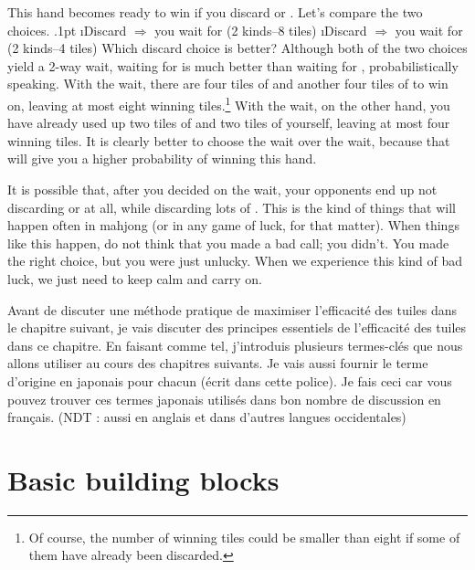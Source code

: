 \bigskip
\noindent
This hand becomes ready to win if you discard {\LARGE{}} or {\LARGE{}}. Let's compare the two choices.
\bi\itemsep.1pt
\i Discard {\LARGE{}} \hfill $\Rightarrow$ you wait for {\LARGE{} } (2 kinds--8 tiles)
\i Discard {\LARGE{}} \hfill $\Rightarrow$ you wait for {\LARGE{}} {\LARGE{}} (2 kinds--4 tiles)
\ei
Which discard choice is better? Although both of the two choices yield a 2-way wait, waiting for {\LARGE{} } is much better than waiting for {\LARGE{}} {\LARGE{}}, probabilistically speaking. With the {\LARGE{} } wait, there are four tiles of {\LARGE{}} and another four tiles of {\LARGE{}} to win on, leaving at most eight winning tiles.\footnote{Of course, the number of winning tiles could be smaller than eight if some of them have already been discarded.} 
With the {\LARGE{}} {\LARGE{}} wait, on the other hand, you have already used up two tiles of {\LARGE{}} and two tiles of {\LARGE{}} yourself, leaving at most four winning tiles. It is clearly better to choose the {\LARGE{} } wait over the {\LARGE{}} {\LARGE{}} wait, because that will give you a higher probability of winning this hand. 

\bigskip
It is possible that, after you decided on the {\LARGE{} } wait, your opponents end up not discarding {\LARGE{}} or {\LARGE{}} at all, while discarding lots of {\LARGE{} }. This is the kind of things that will happen often in mahjong (or in any game of luck, for that matter). When things like this happen, do not think that you made a bad call; you didn't. You made the right choice, but you were just unlucky. When we experience this kind of bad luck, we just need to keep calm and carry on. 

\bigskip
Avant de discuter une méthode pratique de maximiser l'efficacité des tuiles dans le chapitre suivant, je vais discuter des principes essentiels de l'efficacité des tuiles dans ce chapitre. En faisant comme tel, j'introduis plusieurs termes-clés que nous allons utiliser au cours des chapitres suivants. Je vais aussi fournir le terme d'origine en japonais pour chacun (écrit dans {\jap cette police}). Je fais ceci car vous pouvez trouver ces termes japonais utilisés dans bon nombre de discussion en français. (NDT : aussi en anglais et dans d'autres langues occidentales)

\section{Basic building blocks}

